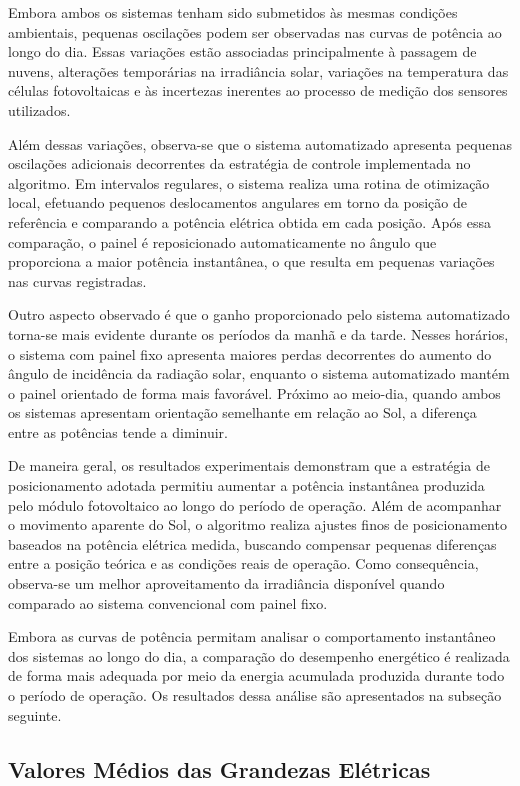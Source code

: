 Embora ambos os sistemas tenham sido submetidos às mesmas condições ambientais, pequenas oscilações podem ser observadas nas curvas de potência ao longo do dia. Essas variações estão associadas principalmente à passagem de nuvens, alterações temporárias na irradiância solar, variações na temperatura das células fotovoltaicas e às incertezas inerentes ao processo de medição dos sensores utilizados.

Além dessas variações, observa-se que o sistema automatizado apresenta pequenas oscilações adicionais decorrentes da estratégia de controle implementada no algoritmo. Em intervalos regulares, o sistema realiza uma rotina de otimização local, efetuando pequenos deslocamentos angulares em torno da posição de referência e comparando a potência elétrica obtida em cada posição. Após essa comparação, o painel é reposicionado automaticamente no ângulo que proporciona a maior potência instantânea, o que resulta em pequenas variações nas curvas registradas.

Outro aspecto observado é que o ganho proporcionado pelo sistema automatizado torna-se mais evidente durante os períodos da manhã e da tarde. Nesses horários, o sistema com painel fixo apresenta maiores perdas decorrentes do aumento do ângulo de incidência da radiação solar, enquanto o sistema automatizado mantém o painel orientado de forma mais favorável. Próximo ao meio-dia, quando ambos os sistemas apresentam orientação semelhante em relação ao Sol, a diferença entre as potências tende a diminuir.

De maneira geral, os resultados experimentais demonstram que a estratégia de posicionamento adotada permitiu aumentar a potência instantânea produzida pelo módulo fotovoltaico ao longo do período de operação. Além de acompanhar o movimento aparente do Sol, o algoritmo realiza ajustes finos de posicionamento baseados na potência elétrica medida, buscando compensar pequenas diferenças entre a posição teórica e as condições reais de operação. Como consequência, observa-se um melhor aproveitamento da irradiância disponível quando comparado ao sistema convencional com painel fixo.

Embora as curvas de potência permitam analisar o comportamento instantâneo dos sistemas ao longo do dia, a comparação do desempenho energético é realizada de forma mais adequada por meio da energia acumulada produzida durante todo o período de operação. Os resultados dessa análise são apresentados na subseção seguinte.

\subsection{Valores Médios das Grandezas Elétricas}

